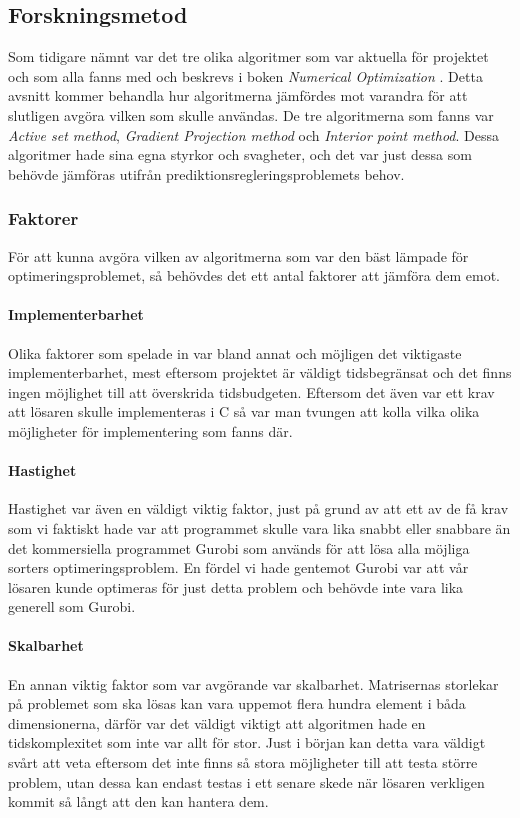 \subsection{Forskningsmetod}
Som tidigare nämnt var det tre olika algoritmer som var aktuella för projektet och som alla fanns med och beskrevs i boken \emph{Numerical Optimization} \citep{numericaloptimization}. Detta avsnitt kommer behandla hur algoritmerna jämfördes mot varandra för att slutligen avgöra vilken som skulle användas.
\newline
\newline
De tre algoritmerna som fanns var \emph{Active set method}, \emph{Gradient Projection method} och \emph{Interior point method}. Dessa algoritmer hade sina egna styrkor och svagheter, och det var just dessa som behövde jämföras utifrån prediktionsregleringsproblemets behov.

\subsubsection{Faktorer}
För att kunna avgöra vilken av algoritmerna som var den bäst lämpade för optimeringsproblemet, så behövdes det ett antal faktorer att jämföra dem emot.

\paragraph{Implementerbarhet}
Olika faktorer som spelade in var bland annat och möjligen det viktigaste implementerbarhet, mest eftersom projektet är väldigt tidsbegränsat och det finns ingen möjlighet till att överskrida tidsbudgeten. Eftersom det även var ett krav att lösaren skulle implementeras i C så var man tvungen att kolla vilka olika möjligheter för implementering som fanns där.

\paragraph{Hastighet}
Hastighet var även en väldigt viktig faktor, just på grund av att ett av de få krav som vi faktiskt hade var att programmet skulle vara lika snabbt eller snabbare än det kommersiella programmet Gurobi som används för att lösa alla möjliga sorters optimeringsproblem. En fördel vi hade gentemot Gurobi var att vår lösaren kunde optimeras för just detta problem och behövde inte vara lika generell som Gurobi.

\paragraph{Skalbarhet}
En annan viktig faktor som var avgörande var skalbarhet. Matrisernas storlekar på problemet som ska lösas kan vara uppemot flera hundra element i båda dimensionerna, därför var det väldigt viktigt att algoritmen hade en tidskomplexitet som inte var allt för stor. Just i början kan detta vara väldigt svårt att veta eftersom det inte finns så stora möjligheter till att testa större problem, utan dessa kan endast testas i ett senare skede när lösaren verkligen kommit så långt att den kan hantera dem.

